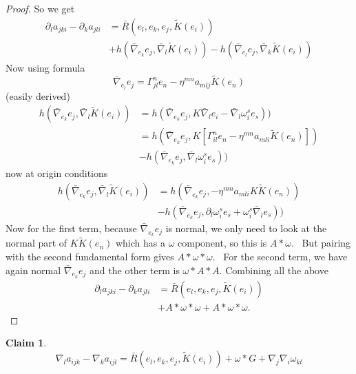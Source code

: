 \documentclass[12pt,letterpaper]{amsart}%
\newcounter{mycounter}
\numberwithin{mycounter}{section}
\theoremstyle{plain}
\newtheorem{claim}[mycounter]{Claim}
\numberwithin{equation}{section}
\theoremstyle{definition}
\begin{document}
\begin{proof}
So we get%
\begin{align*}
\partial_{l}a_{jki}-\partial_{k}a_{jli}  &  =\bar{R}(e_{l},e_{k},e_{j}%
,\tilde{K}(e_{i}))\\
&  +h(\bar{\nabla}_{e_{k}}e_{j},\bar{\nabla}_{l}\tilde{K}(e_{i}))-h(\bar
{\nabla}_{e_{l}}e_{j},\bar{\nabla}_{k}\tilde{K}(e_{i}))
\end{align*}
Now using formula
\[
\bar{\nabla}_{e_{l}}e_{j}=\Gamma_{jl}^{n}e_{n}-\eta^{mn}a_{mlj}\tilde{K}%
(e_{n})
\]
(easily derived)
\begin{align*}
h(\bar{\nabla}_{e_{k}}e_{j},\bar{\nabla}_{l}\tilde{K}(e_{i}))  &
=h(\bar{\nabla}_{e_{k}}e_{j},K\bar{\nabla}_{l}e_{i}-\bar{\nabla}_{l}\omega
_{i}^{s}e_{s}))\\
&  =h(\bar{\nabla}_{e_{k}}e_{j},K\left[  \Gamma_{il}^{n}e_{n}-\eta^{mn}%
a_{mli}\tilde{K}(e_{n})\right]  )\\
&  -h(\bar{\nabla}_{e_{k}}e_{j},\bar{\nabla}_{l}\omega_{i}^{s}e_{s}))
\end{align*}
now at origin conditions
\begin{align*}
h(\bar{\nabla}_{e_{k}}e_{j},\bar{\nabla}_{l}\tilde{K}(e_{i}))  &
=h(\bar{\nabla}_{e_{k}}e_{j},-\eta^{mn}a_{mli}K\tilde{K}(e_{n}))\\
&  -h(\bar{\nabla}_{e_{k}}e_{j},\partial_{l}\omega_{i}^{s}e_{s}+\omega_{i}%
^{s}\bar{\nabla}_{l}e_{s}))
\end{align*}
Now for the first term, because $\bar{\nabla}_{e_{k}}e_{j}$ is normal, we only
need to look at the normal part of $K\tilde{K}(e_{n})$ which has a $\omega$
component, so this is $A\ast\omega.$ \ But pairing with the second fundamental
form gives $A\ast\omega\ast\omega.$ \ For the second term, we have again
normal $\bar{\nabla}_{e_{k}}e_{j}$ and the other term is $\omega\ast A\ast
A.$ Combining all the above
\begin{align*}
\partial_{l}a_{jki}-\partial_{k}a_{jli}  &  =\bar{R}(e_{l},e_{k},e_{j}%
,\tilde{K}(e_{i}))\\
&  +A\ast\omega\ast\omega+A\ast\omega\ast\omega.
\end{align*}

\end{proof}


\begin{claim}
\label{c4}%
\[
\nabla_{l}a_{ijk}-\nabla_{k}a_{ijl}=\bar{R}(e_{l},e_{k},e_{j},\tilde{K}%
(e_{i}))+\omega\ast G+\nabla_{j}\nabla_{i}\omega_{kl}%
\]

\end{claim}
\end{document}
